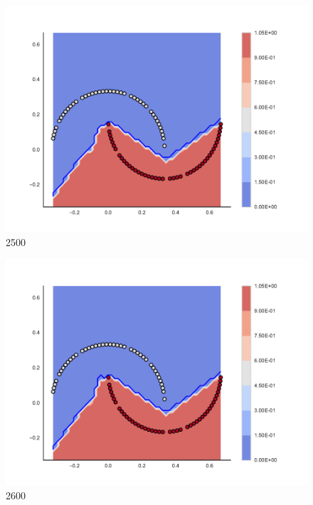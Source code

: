 \begin{subfigure}[b]{0.09\textwidth}
    \includegraphics[clip, trim=2.35cm 1.75cm 4.5cm 0cm,width=\textwidth]{img/convergence/2500.pdf}
    \caption{2500}
    \label{fig:convergence_2500}
\end{subfigure}
%
\begin{subfigure}[b]{0.09\textwidth}
    \includegraphics[clip, trim=2.35cm 1.75cm 4.5cm 0cm,width=\textwidth]{img/convergence/2600.pdf}
    \caption{2600}
    \label{fig:convergence_2600}
\end{subfigure}
%
